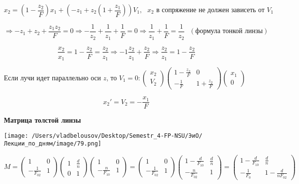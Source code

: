 \documentclass[12pt, a4paper]{report}
\begin{document}
\[ x_2 = \left(  1 - \frac{z_2}{F }  \right) x_1 + \left(- z_1 + z_2 \left( 1 + \frac{z_1}{F }  \right) \right)V_1 , \text{ } x_2 \text{ в сопряжение не должен зависеть от } V_1   \] 


\[ \Rightarrow -z_1 + z_2 + \frac{z_1 z_2 }{F } = 0 \Rightarrow - \frac{1}{z_2 } + \frac{1}{z_1} + \frac{1}{F } = 0 \Rightarrow \frac{1}{z_1 } + \frac{1}{F } = \frac{1}{z_2 } \text{ }  (\text{формула тонкой линзы} )     \] 

\[\frac{x_2}{x_1 } = 1 - \frac{z_2}{F }  =\frac{z_2}{z_1}   \Rightarrow - 1 \frac{z_2}{ z_1 } + \frac{z_2}{F }  \Rightarrow \frac{z_2}{z_1 } = 1 - \frac{z_2}{F}    \] 

Если лучи идет параллельно оси \( z \), то \(\displaystyle  V_1  = 0:   \begin{pmatrix}
x_2\\
V_2 
\end{pmatrix}
\begin{pmatrix}
    1- \frac{z_2}{F }   & 0\\
    - \frac{1}{F }  & 1+ \frac{z_2}{F}  
\end{pmatrix}
\begin{pmatrix}
    x_1 \\
    0
\end{pmatrix}
\) 

\[ x_2 ' = V_2 = - \frac{x_1}{F }  \] 

\textbf{Матрица толстой линзы } 

\begin{center}
    \texttt{[image: /Users/vladbelousov/Desktop/Semestr\_4-FP-NSU/ЭиО/Лекции\_по\_дням/image/79.png]}
\end{center} 
\[ M = \begin{pmatrix}
    1  & 0\\
    - \frac{1}{F_{02} }  & 1
\end{pmatrix} 
\begin{pmatrix}
    1  & \frac{d}{n} \\
    0  & 1
\end{pmatrix}
\begin{pmatrix}
    1  & 0\\
    - \frac{n}{F_{10} }  & 1
\end{pmatrix}  = 
\begin{pmatrix}
    1  & 0\\
    - \frac{1}{F_{02} }  & 1
\end{pmatrix} 
\begin{pmatrix}
1 - \frac{d}{F_{10}}  & \frac{d}{n} \\
-\frac{n}{F_{02}}  & 1
\end{pmatrix}=
\begin{pmatrix}
    1 - \frac{d}{F_{10}}  & \frac{d}{n} \\
    - \frac{1}{F_0}   & 1- \frac{d}{n F_{02}} 
\end{pmatrix} 
\] 
\end{document}
